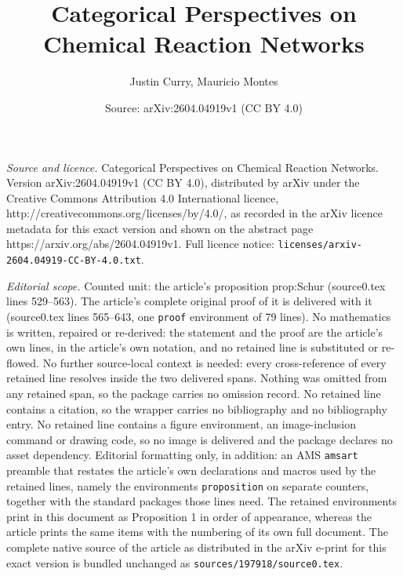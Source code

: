 \documentclass[10pt,a4paper]{amsart}
\title{Categorical Perspectives on Chemical Reaction Networks}
\author{Justin Curry, Mauricio Montes}
\date{Source: arXiv:2604.04919v1 (CC BY 4.0)}
\begin{document}
\maketitle

\noindent\emph{Source and licence.} Categorical Perspectives on Chemical Reaction Networks. Version arXiv:2604.04919v1 (CC BY 4.0), distributed by arXiv under the Creative Commons Attribution 4.0 International licence, http://creativecommons.org/licenses/by/4.0/, as recorded in the arXiv licence metadata for this exact version and shown on the abstract page https://arxiv.org/abs/2604.04919v1. Full licence notice: \texttt{licenses/arxiv-2604.04919-CC-BY-4.0.txt}.\par\smallskip

\noindent\textit{Editorial scope.} Counted unit: the article's proposition prop:Schur (source0.tex lines 529--563). The article's complete original proof of it is delivered with it (source0.tex lines 565--643, one \texttt{proof} environment of 79 lines). No mathematics is written, repaired or re-derived: the statement and the proof are the article's own lines, in the article's own notation, and no retained line is substituted or re-flowed.  No further source-local context is needed: every cross-reference of every retained line resolves inside the two delivered spans.  Nothing was omitted from any retained span, so the package carries no omission record.  No retained line contains a citation, so the wrapper carries no bibliography and no bibliography entry.  No retained line contains a figure environment, an image-inclusion command or drawing code, so no image is delivered and the package declares no asset dependency.  Editorial formatting only, in addition: an AMS \texttt{amsart} preamble that restates the article's own declarations and macros used by the retained lines, namely the environments \texttt{proposition} on separate counters, together with the standard packages those lines need.  The retained environments print in this document as Proposition 1 in order of appearance, whereas the article prints the same items with the numbering of its own full document.  The complete native source of the article as distributed in the arXiv e-print for this exact version is bundled unchanged as \texttt{sources/197918/source0.tex}.
\end{document}
